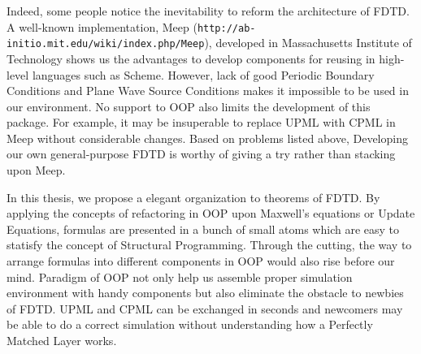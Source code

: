 Indeed, some people notice the inevitability to reform the architecture of FDTD. A well-known implementation, Meep
(\texttt{http://ab-initio.mit.edu/wiki/index.php/Meep}), developed in Massachusetts Institute of Technology shows us the
advantages to develop components for reusing in high-level languages such as Scheme. However, lack of good Periodic
Boundary Conditions and Plane Wave Source Conditions makes it impossible to be used in our environment. No support to
OOP also limits the development of this package. For example, it may be insuperable to replace UPML with CPML in Meep
without considerable changes. Based on problems listed above, Developing our own general-purpose FDTD is worthy of
giving a try rather than stacking upon Meep. 

In this thesis, we propose a elegant organization to theorems of FDTD. By applying the concepts of refactoring in OOP
upon Maxwell's equations or Update Equations, formulas are presented in a bunch of small atoms which are easy to
statisfy the concept of Structural Programming. Through the cutting, the way to arrange formulas into different
components in OOP would also rise before our mind. Paradigm of OOP not only help us assemble proper simulation
environment with handy components but also eliminate the obstacle to newbies of FDTD. UPML and CPML can be exchanged in
seconds and newcomers may be able to do a correct simulation without understanding how a Perfectly Matched Layer works.
